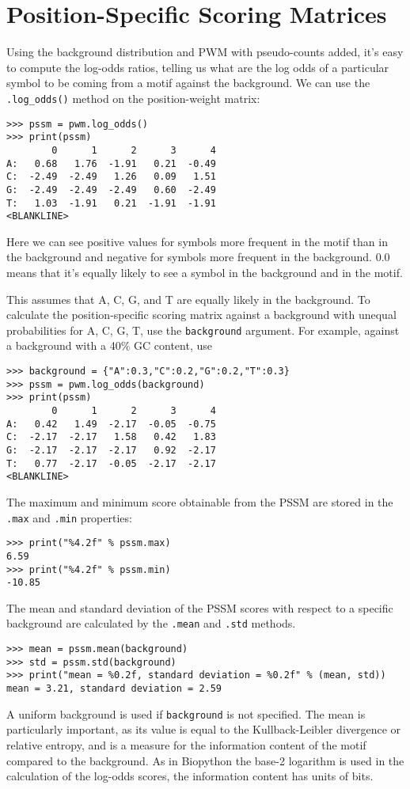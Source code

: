 \section{Position-Specific Scoring Matrices}

Using the background distribution and PWM with pseudo-counts added,
it's easy to compute the log-odds ratios, telling us what are the log
odds of a particular symbol to be coming from a motif against the
background. We can use the \verb|.log_odds()| method on the position-weight
matrix:
\begin{verbatim}
>>> pssm = pwm.log_odds()
>>> print(pssm)
        0      1      2      3      4
A:   0.68   1.76  -1.91   0.21  -0.49
C:  -2.49  -2.49   1.26   0.09   1.51
G:  -2.49  -2.49  -2.49   0.60  -2.49
T:   1.03  -1.91   0.21  -1.91  -1.91
<BLANKLINE>
\end{verbatim}
Here we can see positive values for symbols more frequent in the motif
than in the background and negative for symbols more frequent in the
background. $0.0$ means that it's equally likely to see a symbol in the
background and in the motif.

This assumes that A, C, G, and T are equally likely in the background. To
calculate the position-specific scoring matrix against a background with
unequal probabilities for A, C, G, T, use the \verb+background+ argument.
For example, against a background with a 40\% GC content, use
\begin{verbatim}
>>> background = {"A":0.3,"C":0.2,"G":0.2,"T":0.3}
>>> pssm = pwm.log_odds(background)
>>> print(pssm)
        0      1      2      3      4
A:   0.42   1.49  -2.17  -0.05  -0.75
C:  -2.17  -2.17   1.58   0.42   1.83
G:  -2.17  -2.17  -2.17   0.92  -2.17
T:   0.77  -2.17  -0.05  -2.17  -2.17
<BLANKLINE>
\end{verbatim}

The maximum and minimum score obtainable from the PSSM are stored in the
\verb+.max+ and \verb+.min+ properties:
\begin{verbatim}
>>> print("%4.2f" % pssm.max)
6.59
>>> print("%4.2f" % pssm.min)
-10.85
\end{verbatim}

The mean and standard deviation of the PSSM scores with respect to a specific
background are calculated by the \verb+.mean+ and \verb+.std+ methods.
\begin{verbatim}
>>> mean = pssm.mean(background)
>>> std = pssm.std(background)
>>> print("mean = %0.2f, standard deviation = %0.2f" % (mean, std))
mean = 3.21, standard deviation = 2.59
\end{verbatim}
A uniform background is used if \verb+background+ is not specified.
The mean is particularly important, as its value is equal to the
Kullback-Leibler divergence or relative entropy, and is a measure for the
information content of the motif compared to the background. As in Biopython
the base-2 logarithm is used in the calculation of the log-odds scores, the
information content has units of bits.

